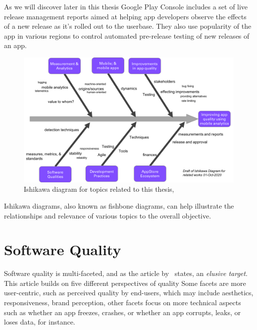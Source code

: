 As we will discover later in this thesis Google Play Console includes a set of live release management reports aimed at helping app developers observe the effects of a new release as it's rolled out to the userbase. They also use popularity of the app in various regions to control automated pre-release testing of new releases of an app.

\clearpage



\begin{figure}[htbp!]
    \centering
    \includegraphics[width=15cm]{images/related-works-ishikawa-diagram-01-oct-2020.png}
    \caption{Ishikawa diagram for topics related to this thesis, }
    \label{fig:related_works_ishikawa_diagram}
\end{figure}

Ishikawa diagrams, also known as fishbone diagrams, can help illustrate the relationships and relevance of various topics to the overall objective. 



\hypertarget{software.quality}{}
\section{Software Quality}
Software quality is multi-faceted, and as the article by~\citep{kitchenham1996_software_quality_elusive_target} states, an \emph{elusive target}. This article builds on five different perspectives of quality Some facets are more user-centric, such as perceived quality by end-users, which may include aesthetics, responsiveness, brand perception, other facets focus on more technical aspects such as whether an app freezes, crashes, or whether an app corrupts, leaks, or loses data, for instance. 


